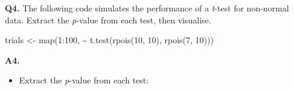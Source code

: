 \documentclass[
]{book}
\newenvironment{Shaded}{\begin{snugshade}}{\end{snugshade}}
\newcommand{\DecValTok}[1]{\textcolor[rgb]{0.00,0.00,0.81}{#1}}
\newcommand{\FunctionTok}[1]{\textcolor[rgb]{0.00,0.00,0.00}{#1}}
\newcommand{\NormalTok}[1]{#1}
\newcommand{\OtherTok}[1]{\textcolor[rgb]{0.56,0.35,0.01}{#1}}
\newcommand{\SpecialCharTok}[1]{\textcolor[rgb]{0.00,0.00,0.00}{#1}}
\providecommand{\tightlist}{%
  \setlength{\itemsep}{0pt}\setlength{\parskip}{0pt}}
\begin{document}
\textbf{Q4.} The following code simulates the performance of a \emph{t}-test for non-normal data. Extract the \emph{p}-value from each test, then visualise.

\begin{Shaded}
\begin{Highlighting}[]
\NormalTok{trials }\OtherTok{\textless{}{-}} \FunctionTok{map}\NormalTok{(}\DecValTok{1}\SpecialCharTok{:}\DecValTok{100}\NormalTok{, }\SpecialCharTok{\textasciitilde{}} \FunctionTok{t.test}\NormalTok{(}\FunctionTok{rpois}\NormalTok{(}\DecValTok{10}\NormalTok{, }\DecValTok{10}\NormalTok{), }\FunctionTok{rpois}\NormalTok{(}\DecValTok{7}\NormalTok{, }\DecValTok{10}\NormalTok{)))}
\end{Highlighting}
\end{Shaded}

\textbf{A4.}

\begin{itemize}
\tightlist
\item
  Extract the \emph{p}-value from each test:
\end{itemize}
\end{document}
